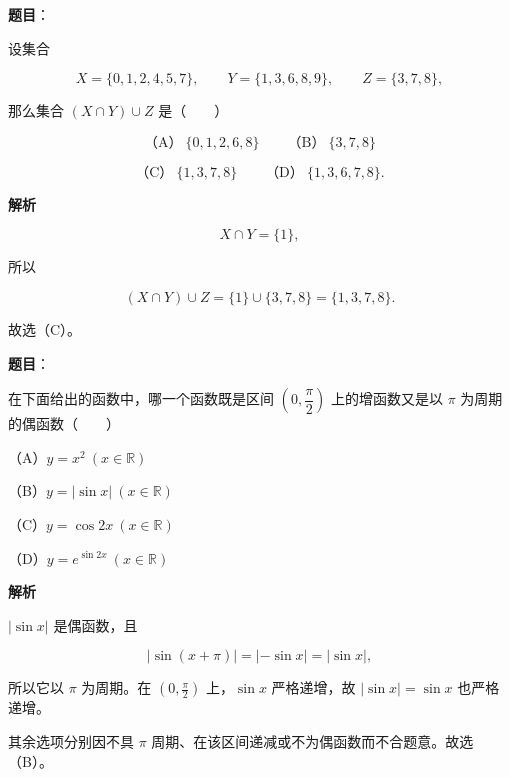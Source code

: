 \begin{answer}

\textbf{题目}：

设集合

\nopagebreak[4]
\[
X=\{0,1,2,4,5,7\},\qquad
Y=\{1,3,6,8,9\},\qquad
Z=\{3,7,8\},
\]

那么集合 $(X\cap Y)\cup Z$ 是\mbox{（　　）}

\nopagebreak[4]
\[
\text{（A）}\ \{0,1,2,6,8\}
\qquad
\text{（B）}\ \{3,7,8\}
\]

\nopagebreak[4]
\[
\text{（C）}\ \{1,3,7,8\}
\qquad
\text{（D）}\ \{1,3,6,7,8\}.
\]

\textbf{解析}

\nopagebreak[4]
\[
X\cap Y=\{1\},
\]

所以

\nopagebreak[4]
\[
(X\cap Y)\cup Z=\{1\}\cup\{3,7,8\}=\{1,3,7,8\}.
\]

故选（C）。


\end{answer}
\begin{answer}

\textbf{题目}：

在下面给出的函数中，哪一个函数既是区间 $\left(0,\dfrac\pi2\right)$ 上的增函数又是以 $\pi$ 为周期的偶函数\mbox{（　　）}

（A）$y=x^2\ (x\in\mathbb R)$

（B）$y=|\sin x|\ (x\in\mathbb R)$

（C）$y=\cos2x\ (x\in\mathbb R)$

（D）$y=e^{\sin2x}\ (x\in\mathbb R)$

\textbf{解析}

$|\sin x|$ 是偶函数，且

\nopagebreak[4]
\[
|\sin(x+\pi)|=|-\sin x|=|\sin x|,
\]

所以它以 $\pi$ 为周期。在 $\left(0,\frac\pi2\right)$ 上，$\sin x$ 严格递增，故 $|\sin x|=\sin x$ 也严格递增。

其余选项分别因不具 $\pi$ 周期、在该区间递减或不为偶函数而不合题意。故选（B）。


\end{answer}
